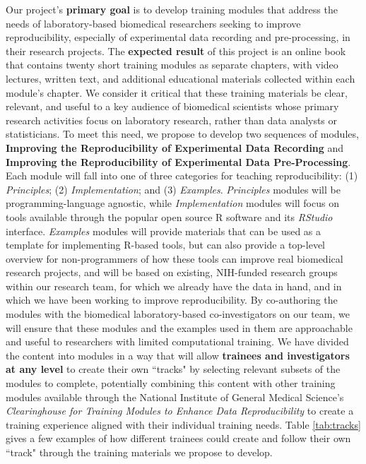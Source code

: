 \documentclass[pdftex,english,11.5pt,parskip=half]{scrartcl}
\begin{document}
Our project's \textbf{primary goal} is to develop
training modules that address the needs of laboratory-based biomedical
researchers seeking to improve reproducibility, especially of experimental data
recording and pre-processing, in their research projects. The \textbf{expected result} of
this project is an online book that contains twenty short training modules as separate
chapters, with video lectures, written text, and additional educational
materials collected within each module's chapter. We consider it critical that
these training materials be clear, relevant, and useful to a key audience of
biomedical scientists whose primary research activities focus on laboratory
research, rather than data analysts or statisticians. 
To meet this need, we propose to develop two sequences of modules, \textbf{Improving the
Reproducibility of Experimental Data Recording} and \textbf{Improving the
Reproducibility of Experimental Data Pre-Processing}. 
Each module will fall into one of three categories for teaching reproducibility:
(1) \textit{Principles}; (2) \textit{Implementation}; and (3) \textit{Examples}. \textit{Principles}
modules will be programming-language agnostic, while \textit{Implementation} modules
will focus on tools available through the popular open source R software and its
\textit{RStudio} interface. \textit{Examples} modules will provide materials that can be used as a template for implementing R-based tools, but can also provide a top-level overview for non-programmers of how these tools can improve real biomedical research projects, and will be based on existing, NIH-funded research groups within our research team, for which we already have the data in hand, and in which we have been working to improve reproducibility. By co-authoring the modules with the biomedical laboratory-based co-investigators
on our team, we will ensure that these modules and the examples used in them are
approachable and useful to researchers with limited computational training. We
have divided the content into modules in a way that will allow \textbf{trainees
and investigators at any level} to create their own ``tracks" by selecting
relevant subsets of the modules to complete, potentially combining this
content with other training modules available through the National Institute of General Medical Science's \textit{Clearinghouse for Training Modules to Enhance Data Reproducibility}
\cite{clearinghouse} to create a training experience aligned with their individual training needs. Table \ref*{tab:tracks} gives a few examples of how different trainees
could create and follow their own ``track" through the training materials we propose to develop.
\end{document}
